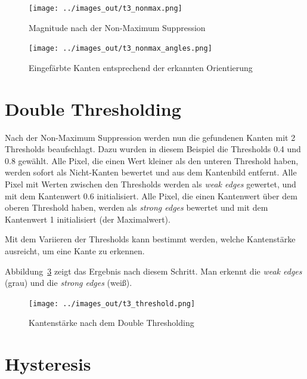 \smallskip

\begin{figure}[htb]
 \centering
 \texttt{[image: ../images\_out/t3\_nonmax.png]}
 \caption{Magnitude nach der Non-Maximum Suppression}
 \label{fig:t3_nonmax}
\end{figure}

\begin{figure}[htb]
 \centering
 \texttt{[image: ../images\_out/t3\_nonmax\_angles.png]}
 \caption{Eingefärbte Kanten entsprechend der erkannten Orientierung}
 \label{fig:t3_nonmax_angles}
\end{figure}

\clearpage



\section{Double Thresholding}

Nach der Non-Maximum Suppression werden nun die gefundenen Kanten mit 2 Thresholds beaufschlagt. Dazu wurden in diesem Beispiel die Thresholds 0.4 und 0.8 gewählt. Alle Pixel, die einen Wert kleiner als den unteren Threshold haben, werden sofort als Nicht-Kanten bewertet und aus dem Kantenbild entfernt. Alle Pixel mit Werten zwischen den Thresholds werden als \emph{weak edges} gewertet, und mit dem Kantenwert 0.6 initialisiert. Alle Pixel, die einen Kantenwert über dem oberen Threshold haben, werden als \emph{strong edges} bewertet und mit dem Kantenwert 1 initialisiert (der Maximalwert).

Mit dem Variieren der Thresholds kann bestimmt werden, welche Kantenstärke ausreicht, um eine Kante zu erkennen.

Abbildung~\ref{fig:t3_threshold} zeigt das Ergebnis nach diesem Schritt. Man erkennt die \emph{weak edges} (grau) und die \emph{strong edges} (weiß).

\smallskip

\begin{figure}[htb]
 \centering
 \texttt{[image: ../images\_out/t3\_threshold.png]}
 \caption{Kantenstärke nach dem Double Thresholding}
 \label{fig:t3_threshold}
\end{figure}

\clearpage



\section{Hysteresis}

